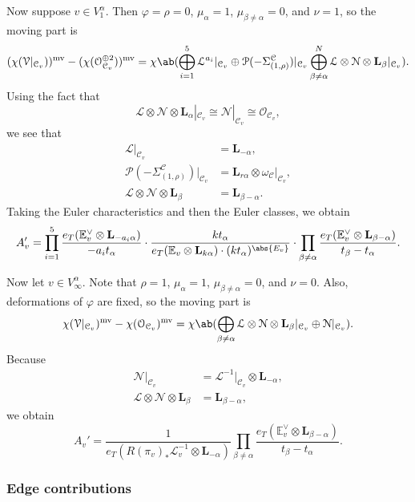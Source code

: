 \documentclass{amsart}
\theoremstyle{definition}
\theoremstyle{remark}
\theoremstyle{plain}
\theoremstyle{definition}
\theoremstyle{remark}
\newcommand{\E}{\mathbb{E}}
\newcommand{\mc}[1]{\mathcal{#1}}
\newcommand{\mbf}[1]{\mathbf{#1}}
\newcommand{\mr}[1]{\mathrm{#1}}
\newcommand{\1}{\mathbf{1}}
\newcommand{\2}{\mathbf{2}}
\newcommand{\3}{\mathbf{3}}
\newcommand{\mv}{\mr{mv}}
\begin{document}
Now suppose $v \in V_1^{\alpha}$. Then $\varphi = \rho = 0$, $\mu_{\alpha} = 1$, $\mu_{\beta \neq \alpha} = 0$, and $\nu = 1$, so the moving part is
\[ (\chi(\mc{V}|_{\mc{C}_v}))^{\mv} - (\chi(\mc{O}_{\mc{C}_v}^{\oplus 2}))^{\mv} = \chi \ab(\bigoplus_{i=1}^5 \mc{L}^{a_i}|_{\mc{C}_v} \oplus \mc{P}(-\Sigma_{(1,\rho)}^{\mc{C}})|_{\mc{C}_v} \bigoplus_{\beta \neq \alpha}^N \mc{L} \otimes \mc{N} \otimes \mbf{L}_{\beta}|_{\mc{C}_v}). \]
Using the fact that 
\[ \mc{L} \otimes \mc{N} \otimes \mbf{L}_{\alpha} |_{\mc{C}_v} \cong \mc{N}|_{\mc{C}_v} \cong \mc{O}_{\mc{C}_v}, \]
we see that
\begin{align*}
    \mc{L}|_{\mc{C}_v} &= \mbf{L}_{-\alpha}, \\
    \mc{P}(-\Sigma_{(1,\rho)}^{\mc{C}})|_{\mc{C}_v} &= \mbf{L}_{r \alpha} \otimes \omega_{\mc{C}}|_{\mc{C}_v}, \\
    \mc{L}\otimes \mc{N} \otimes \mbf{L}_{\beta} &= \mbf{L}_{\beta - \alpha}.
\end{align*}
Taking the Euler characteristics and then the Euler classes, we obtain
\[ A_v' = \prod_{i=1}^5 \frac{e_T(\E_v^{\vee} \otimes \mbf{L}_{-a_i \alpha})}{-a_i t_{\alpha}} \cdot \frac{kt_{\alpha}}{e_T(\E_v \otimes \mbf{L}_{k\alpha}) \cdot (k t_{\alpha})^{\abs{E_v}}} \cdot \prod_{\beta \neq \alpha} \frac{e_T(\E_v^{\vee} \otimes \mbf{L}_{\beta - \alpha})}{t_{\beta} - t_{\alpha}}. \]

Now let $v \in V_{\infty}^{\alpha}$. Note that $\rho = 1$, $\mu_{\alpha} = 1$, $\mu_{\beta \neq \alpha} = 0$, and $\nu = 0$. Also, deformations of $\varphi$ are fixed, so the moving part is
\[ \chi(\mc{V}|_{\mc{C}_v})^{\mv} - \chi(\mc{O}_{\mc{C}_v})^{\mv} = \chi\ab(\bigoplus_{\beta \neq \alpha} \mc{L}\otimes \mc{N} \otimes \mbf{L}_{\beta} |_{\mc{C}_v} \oplus \mc{N} |_{\mc{C}_v}). \]
Because
\begin{align*}
    \mc{N}|_{\mc{C}_v} &= \mc{L}^{-1}|_{\mc{C}_v} \otimes \mbf{L}_{-\alpha}, \\
    \mc{L}\otimes \mc{N} \otimes \mbf{L}_{\beta} &= \mbf{L}_{\beta - \alpha},
\end{align*}
we obtain
\[ A_v' = \frac{1}{e_T(R (\pi_v)_* \mc{L}_v^{-1} \otimes \mbf{L}_{-\alpha})} \prod_{\beta \neq \alpha} \frac{e_T(\E_v^{\vee} \otimes \mbf{L}_{\beta - \alpha})}{t_{\beta} - t_{\alpha}}. \]


\subsubsection{Edge contributions}%
\label{ssub:Edge contributions}
\end{document}
